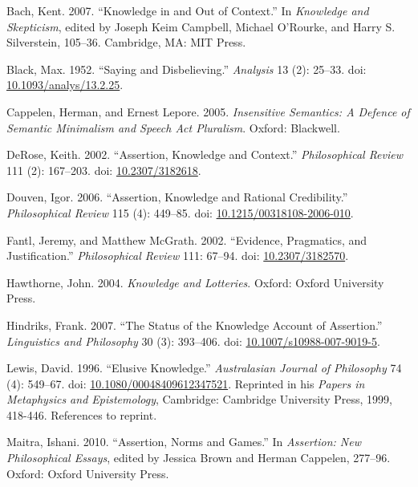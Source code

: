 \documentclass[
  10pt,
  letterpaper,
  DIV=11,
  numbers=noendperiod,
  twoside]{scrartcl}
\newlength{\cslhangindent}
\newenvironment{CSLReferences}[2] %
 {\begin{list}{}{%
  \setlength{\itemindent}{0pt}
  \setlength{\leftmargin}{0pt}
  \setlength{\parsep}{0pt}
  \ifodd #1
   \setlength{\leftmargin}{\cslhangindent}
   \setlength{\itemindent}{-1\cslhangindent}
  \fi
  \setlength{\itemsep}{#2\baselineskip}}}
 {\end{list}}
\begin{document}
\label{refs}
\begin{CSLReferences}{1}{0}
Bach, Kent. 2007. {``Knowledge in and Out of Context.''} In
\emph{Knowledge and Skepticism}, edited by Joseph Keim Campbell, Michael
O'Rourke, and Harry S. Silverstein, 105--36. Cambridge, MA: MIT Press.

Black, Max. 1952. {``Saying and Disbelieving.''} \emph{Analysis} 13 (2):
25--33. doi:
\href{https://doi.org/10.1093/analys/13.2.25}{10.1093/analys/13.2.25}.

Cappelen, Herman, and Ernest Lepore. 2005. \emph{Insensitive Semantics:
A Defence of Semantic Minimalism and Speech Act Pluralism}. Oxford:
Blackwell.

DeRose, Keith. 2002. {``Assertion, Knowledge and Context.''}
\emph{Philosophical Review} 111 (2): 167--203. doi:
\href{https://doi.org/10.2307/3182618}{10.2307/3182618}.

Douven, Igor. 2006. {``Assertion, Knowledge and Rational Credibility.''}
\emph{Philosophical Review} 115 (4): 449--85. doi:
\href{https://doi.org/10.1215/00318108-2006-010}{10.1215/00318108-2006-010}.

Fantl, Jeremy, and Matthew McGrath. 2002. {``Evidence, Pragmatics, and
Justification.''} \emph{Philosophical Review} 111: 67--94. doi:
\href{https://doi.org/10.2307/3182570}{10.2307/3182570}.

Hawthorne, John. 2004. \emph{Knowledge and Lotteries}. Oxford: Oxford
University Press.

Hindriks, Frank. 2007. {``The Status of the Knowledge Account of
Assertion.''} \emph{Linguistics and Philosophy} 30 (3): 393--406. doi:
\href{https://doi.org/10.1007/s10988-007-9019-5}{10.1007/s10988-007-9019-5}.

Lewis, David. 1996. {``Elusive Knowledge.''} \emph{Australasian Journal
of Philosophy} 74 (4): 549--67. doi:
\href{https://doi.org/10.1080/00048409612347521}{10.1080/00048409612347521}.
Reprinted in his \emph{Papers in Metaphysics and Epistemology},
Cambridge: Cambridge University Press, 1999, 418-446. References to
reprint.

Maitra, Ishani. 2010. {``Assertion, Norms and Games.''} In
\emph{Assertion: New Philosophical Essays}, edited by Jessica Brown and
Herman Cappelen, 277--96. Oxford: Oxford University Press.


\end{CSLReferences}
\end{document}
